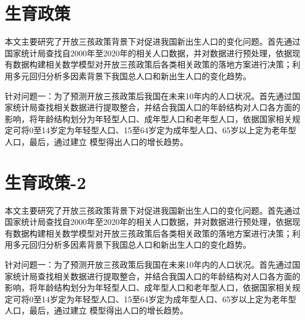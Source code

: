 

\nocite{*}      %




\appendix
\section{生育政策}

本文主要研究了开放三孩政策背景下对促进我国新出生人口的变化问题。首先通过国家统计局查找自2000年至2020年的相关人口数据，并对数据进行预处理，依据现有数据构建相关数学模型对开放三孩政策后各类相关政策的落地方案进行决策；利用多元回归分析多因素背景下我国总人口和新出生人口的变化趋势。

针对问题一：为了预测开放三孩政策后我国在未来10年内的人口状况。首先通过国家统计局查找相关数据进行提取整合，并结合我国人口的年龄结构对人口各方面的影响，将年龄结构划分为年轻型人口、成年型人口和老年型人口，依据国家相关规定可将0至14岁定为年轻型人口、15至64岁定为成年型人口、65岁以上定为老年型人口，最后，通过建立 模型得出人口的增长趋势。

\section{生育政策-2}

本文主要研究了开放三孩政策背景下对促进我国新出生人口的变化问题。首先通过国家统计局查找自2000年至2020年的相关人口数据，并对数据进行预处理，依据现有数据构建相关数学模型对开放三孩政策后各类相关政策的落地方案进行决策；利用多元回归分析多因素背景下我国总人口和新出生人口的变化趋势。

针对问题一：为了预测开放三孩政策后我国在未来10年内的人口状况。首先通过国家统计局查找相关数据进行提取整合，并结合我国人口的年龄结构对人口各方面的影响，将年龄结构划分为年轻型人口、成年型人口和老年型人口，依据国家相关规定可将0至14岁定为年轻型人口、15至64岁定为成年型人口、65岁以上定为老年型人口，最后，通过建立 模型得出人口的增长趋势。
